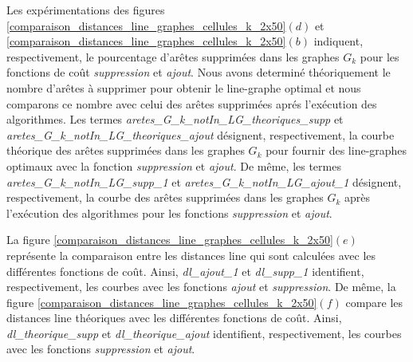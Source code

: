 Les  exp\'erimentations  des figures \ref{comparaison_distances_line_graphes_cellules_k_2x50}$(d)$ et \ref{comparaison_distances_line_graphes_cellules_k_2x50}$(b)$ indiquent, respectivement, le pourcentage d'ar\^etes supprim\'ees dans les graphes $G_k$ pour les fonctions de co\^ut {\em suppression} et {\em ajout}. Nous avons determin\'e th\'eoriquement le nombre d'ar\^etes \`a supprimer pour obtenir le line-graphe optimal et nous comparons ce nombre avec celui des ar\^etes supprim\'ees apr\'es l'ex\'ecution des algorithmes. 
Les termes {\em aretes\_G\_k\_notIn\_LG\_theoriques\_supp} et {\em aretes\_G\_k\_notIn\_LG\_theoriques\_ajout} d\'esignent, respectivement, la courbe th\'eorique des ar\^etes supprim\'ees dans les graphes $G_k$ pour fournir des line-graphes optimaux avec la fonction {\em suppression} et {\em ajout}. De m\^eme, les termes {\em aretes\_G\_k\_notIn\_LG\_supp\_1} et  {\em aretes\_G\_k\_notIn\_LG\_ajout\_1} d\'esignent, respectivement, la courbe des ar\^etes supprim\'ees dans les graphes $G_k$ apr\`es l'ex\'ecution des algorithmes pour les fonctions {\em suppression} et {\em ajout}.

La figure \ref{comparaison_distances_line_graphes_cellules_k_2x50}$(e)$ repr\'esente la comparaison entre les distances line qui sont calcul\'ees avec les diff\'erentes fonctions de co\^ut. Ainsi, {\em dl\_ajout\_1} et {\em dl\_supp\_1} identifient, respectivement, les courbes avec les fonctions {\em ajout} et {\em suppression}. 
De m\^eme, la figure \ref{comparaison_distances_line_graphes_cellules_k_2x50}$(f)$ compare les distances line th\'eoriques avec les diff\'erentes fonctions de co\^ut. Ainsi, {\em dl\_theorique\_supp} et {\em dl\_theorique\_ajout} identifient, respectivement, les courbes avec les fonctions {\em suppression} et {\em ajout}. 
\newline

